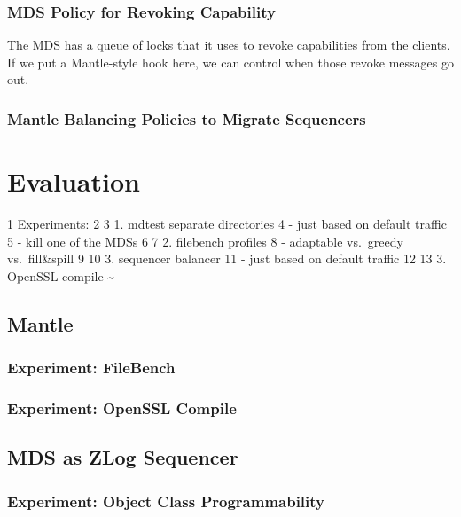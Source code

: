 \documentclass[10pt,twocolumn]{article}
\begin{document}
\subsubsection{MDS Policy for Revoking
Capability}\label{mds-policy-for-revoking-capability}

The MDS has a queue of locks that it uses to revoke capabilities from
the clients. If we put a Mantle-style hook here, we can control when
those revoke messages go out.

\subsubsection{Mantle Balancing Policies to Migrate
Sequencers}\label{mantle-balancing-policies-to-migrate-sequencers}

\section{Evaluation}\label{evaluation}

1 Experiments: 2 3 1. mdtest separate directories 4 - just based on
default traffic 5 - kill one of the MDSs 6 7 2. filebench profiles 8 -
adaptable vs.~greedy vs.~fill\&spill 9 10 3. sequencer balancer 11 -
just based on default traffic 12 13 3. OpenSSL compile
\textasciitilde{}\\\label{evaluation}

\subsection{Mantle}\label{mantle}

\subsubsection{Experiment: FileBench}\label{experiment-filebench}

\subsubsection{Experiment: OpenSSL
Compile}\label{experiment-openssl-compile}

\subsection{MDS as ZLog Sequencer}\label{mds-as-zlog-sequencer}

\subsubsection{Experiment: Object Class
Programmability}\label{experiment-object-class-programmability}
\end{document}
